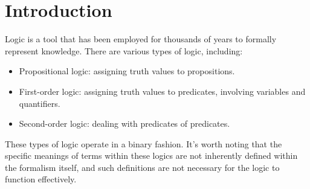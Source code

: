 \section{Introduction}

Logic is a tool that has been employed for thousands of years to formally represent knowledge. There are various types of logic, including:
\begin{itemize}
    \item Propositional logic: assigning truth values to propositions.
    \item First-order logic: assigning truth values to predicates, involving variables and quantifiers.
    \item Second-order logic: dealing with predicates of predicates.
\end{itemize}
These types of logic operate in a binary fashion. 
It's worth noting that the specific meanings of terms within these logics are not inherently defined within the formalism itself, and such definitions are not necessary for the logic to function effectively.